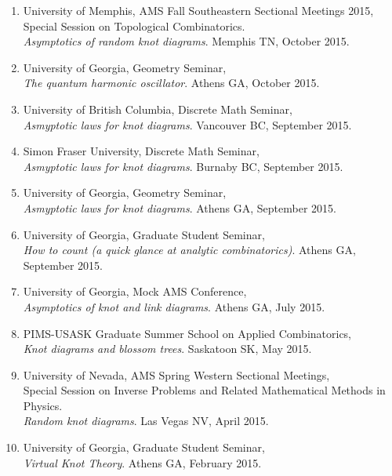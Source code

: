 \documentclass[letterpaper]{article}
\begin{document}
\begin{enumerate}
\item University of Memphis, AMS Fall Southeastern Sectional Meetings 2015,\\
  Special Session on Topological Combinatorics. \\
  \textit{Asymptotics of random knot diagrams}. Memphis TN, October 2015.

\item University of Georgia, Geometry Seminar,\\
  \textit{The quantum harmonic oscillator}. Athens GA, October 2015.
  
\item University of British Columbia, Discrete Math Seminar, \\
  \textit{Asmyptotic laws for knot diagrams}. Vancouver BC, September 2015.
  
\item Simon Fraser University, Discrete Math Seminar, \\
  \textit{Asmyptotic laws for knot diagrams}. Burnaby BC, September 2015.
  
\item University of Georgia, Geometry Seminar, \\
  \textit{Asmyptotic laws for knot diagrams}. Athens GA, September 2015.
  
\item University of Georgia, Graduate Student Seminar, \\
  \textit{How to count (a quick glance at analytic combinatorics)}. Athens GA, September 2015.
  
\item University of Georgia, Mock AMS Conference, \\
  \textit{Asymptotics of knot and link diagrams}. Athens GA, July 2015.

\item PIMS-USASK Graduate Summer School on Applied Combinatorics, \\
  \textit{Knot diagrams and blossom trees}. Saskatoon SK, May 2015.
  
\item University of Nevada, AMS Spring Western Sectional Meetings,\\
  Special Session on Inverse Problems and Related Mathematical Methods in Physics. \\
  \textit{Random knot diagrams}. Las Vegas NV, April 2015.
  
\item University of Georgia, Graduate Student Seminar,\\
  \textit{Virtual Knot Theory}. Athens GA, February 2015.
  

\end{enumerate}
\end{document}
